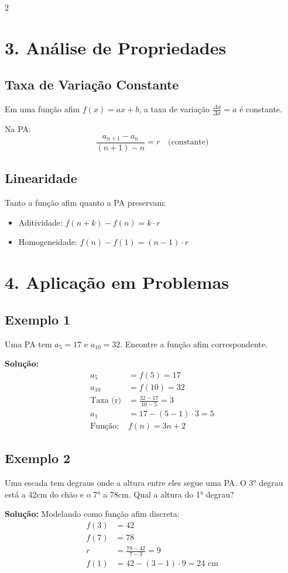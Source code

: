 \documentclass[11pt]{article}
\begin{document}
\begin{multicols}{2}
\section*{3. Análise de Propriedades}
\subsection*{Taxa de Variação Constante}
Em uma função afim $f(x) = ax + b$, a taxa de variação $\frac{\Delta y}{\Delta x} = a$ é constante.

Na PA:
\[
\frac{a_{n+1} - a_n}{(n+1)-n} = r \quad \text{(constante)}
\]

\subsection*{Linearidade}
Tanto a função afim quanto a PA preservam:
\begin{itemize}
\item Aditividade: $f(n+k) - f(n) = k \cdot r$
\item Homogeneidade: $f(n) - f(1) = (n-1) \cdot r$
\end{itemize}

\section*{4. Aplicação em Problemas}
\subsection*{Exemplo 1}
Uma PA tem $a_5 = 17$ e $a_{10} = 32$. Encontre a função afim correspondente.

\textbf{Solução:}
\begin{align*}
a_5 &= f(5) = 17 \\
a_{10} &= f(10) = 32 \\
\text{Taxa (r)} &= \frac{32-17}{10-5} = 3 \\
a_1 &= 17 - (5-1)\cdot3 = 5 \\
\text{Função: } & f(n) = 3n + 2
\end{align*}

\subsection*{Exemplo 2}
Uma escada tem degraus onde a altura entre eles segue uma PA. O 3° degrau está a 42cm do chão e o 7° a 78cm. Qual a altura do 1° degrau?

\textbf{Solução:}
Modelando como função afim discreta:
\begin{align*}
f(3) &= 42 \\
f(7) &= 78 \\
r &= \frac{78-42}{7-3} = 9 \\
f(1) &= 42 - (3-1)\cdot9 = 24 \text{ cm}
\end{align*}


\end{multicols}
\end{document}
